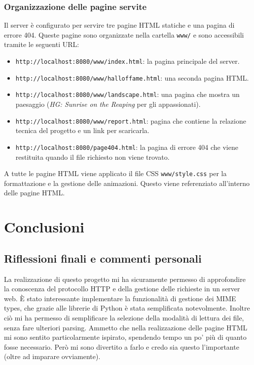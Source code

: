 \documentclass[a4paper,12pt]{report}
\begin{document}
\subsection{Organizzazione delle pagine servite}
\label{sec:organizzazione-pagine}
Il server è configurato per servire tre pagine HTML statiche e una pagina di errore 404. Queste pagine sono organizzate nella cartella \texttt{www/} e sono accessibili tramite le seguenti URL:
\begin{itemize}
    \item \texttt{http://localhost:8080/www/index.html}: la pagina principale del server.
    \item \texttt{http://localhost:8080/www/halloffame.html}: una seconda pagina HTML.
    \item \texttt{http://localhost:8080/www/landscape.html}: una pagina che mostra un paesaggio (\textit{HG: Sunrise on the Reaping} per gli appassionati).
    \item \texttt{http://localhost:8080/www/report.html}: pagina che contiene la relazione tecnica del progetto e un link per scaricarla.
    \item \texttt{http://localhost:8080/page404.html}: la pagina di errore 404 che viene restituita quando il file richiesto non viene trovato.
\end{itemize}
A tutte le pagine HTML viene applicato il file CSS \texttt{www/style.css} per la formattazione e la gestione delle animazioni. Questo viene referenziato all'interno delle pagine HTML.


\chapter{Conclusioni}
\label{sec:conclusioni}

\section{Riflessioni finali e commenti personali}
La realizzazione di questo progetto mi ha sicuramente permesso di approfondire la conoscenza del protocollo HTTP e della gestione delle richieste in un server web. È stato interessante implementare la funzionalità di gestione dei MIME types, che grazie alle librerie di Python è stata semplificata notevolmente. Inoltre ciò mi ha permesso di semplificare la selezione della modalità di lettura dei file, senza fare ulteriori parsing. Ammetto che nella realizzazione delle pagine HTML mi sono sentito particolarmente ispirato, spendendo tempo un po' più di quanto fosse necessario. Però mi sono divertito a farlo e credo sia questo l'importante (oltre ad imparare ovviamente).
\end{document}
